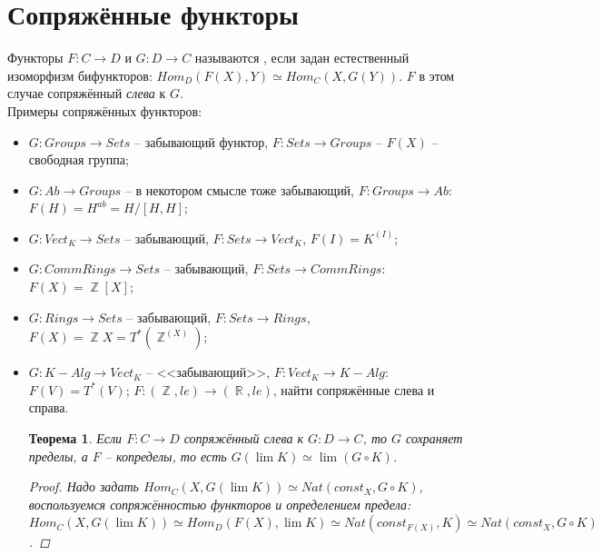 \documentclass[a4paper]{article}
\theoremstyle{indented}
\newtheorem{theorem}{Теорема}
\theoremstyle{definition}
\theoremstyle{remark}
\DeclareMathOperator{\ZZ}{\mathbb{Z}}
\DeclareMathOperator{\RR}{\mathbb{R}}
\begin{document}
\section{Сопряжённые функторы}
 Функторы $F: C \longrightarrow D$ и $G: D \longrightarrow C$ называются , если задан естественный изоморфизм бифункторов: $Hom_D(F(X), Y) \simeq Hom_C(X, G(Y))$. $F$ в этом случае сопряжённый \textit{слева} к $G$.
\\Примеры сопряжённых функторов: \begin{itemize}
\item $G: Groups \longrightarrow Sets$ -- забывающий функтор, $F: Sets \longrightarrow Groups$ -- $F(X)$ -- свободная группа;
\item $G: Ab \longrightarrow Groups$ -- в некотором смысле тоже забывающий, $F: Groups \longrightarrow Ab$: $F(H) = H^{ab} = H/[H, H]$;
\item $G: Vect_K \longrightarrow Sets$ -- забывающий, $F: Sets \rightarrow Vect_K$, $F(I) = K^{(I)}$;
\item $G: CommRings \longrightarrow Sets$ -- забывающий, $F: Sets \longrightarrow CommRings$: $F(X) = \ZZ [X]$;
\item $G: Rings \longrightarrow Sets$ -- забывающий, $F: Sets \longrightarrow Rings$, $F(X) = \ZZ {X} = T^*(\ZZ ^{(X)})$;
\item $G: K-Alg \longrightarrow Vect_K$ -- <<забывающий>>, $F: Vect_K \longrightarrow K-Alg$: $F(V) = T^*(V)$;
\exer $F: (\ZZ, le) \longrightarrow (\RR, le)$, найти сопряжённые слева и справа.
\begin{theorem}
Если $F: C \longrightarrow D$ сопряжённый слева к $G: D \longrightarrow C$, то $G$ сохраняет пределы, а $F$ -- копределы, то есть $G(\lim K) \simeq \lim (G \circ K)$.  
\begin{proof}
Надо задать $Hom_C(X, G(\lim K)) \simeq Nat(const_X, G \circ K)$, воспользуемся сопряжённостью функторов и определением предела: $Hom_C(X, G(\lim K)) \simeq Hom_D(F(X), \lim K) \simeq Nat(const_{F(X)}, K) \simeq Nat(const_X, G \circ K)$. 
\end{proof}
\end{theorem}


\end{itemize}
\end{document}
